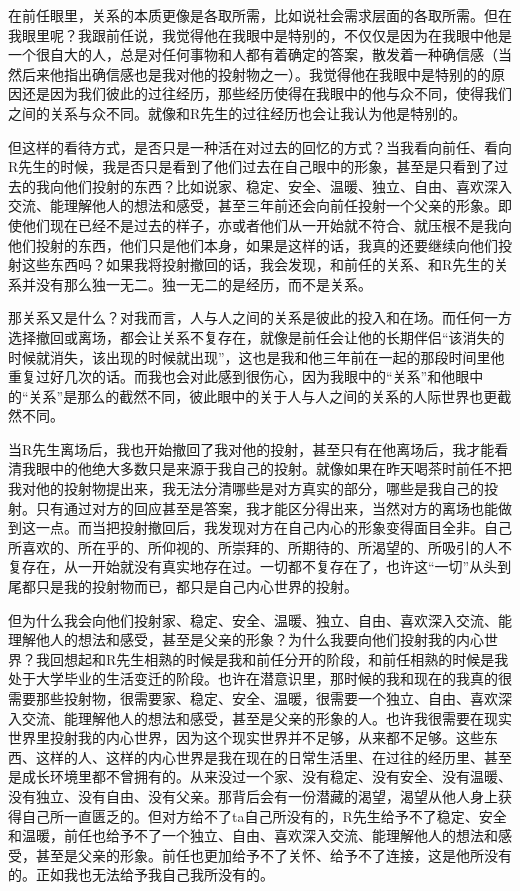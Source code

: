 在前任眼里，关系的本质更像是各取所需，比如说社会需求层面的各取所需。但在我眼里呢？我跟前任说，我觉得他在我眼中是特别的，不仅仅是因为在我眼中他是一个很自大的人，总是对任何事物和人都有着确定的答案，散发着一种确信感（当然后来他指出确信感也是我对他的投射物之一）。我觉得他在我眼中是特别的的原因还是因为我们彼此的过往经历，那些经历使得在我眼中的他与众不同，使得我们之间的关系与众不同。就像和R先生的过往经历也会让我认为他是特别的。

但这样的看待方式，是否只是一种活在对过去的回忆的方式？当我看向前任、看向R先生的时候，我是否只是看到了他们过去在自己眼中的形象，甚至是只看到了过去的我向他们投射的东西？比如说家、稳定、安全、温暖、独立、自由、喜欢深入交流、能理解他人的想法和感受，甚至三年前还会向前任投射一个父亲的形象。即使他们现在已经不是过去的样子，亦或者他们从一开始就不符合、就压根不是我向他们投射的东西，他们只是他们本身，如果是这样的话，我真的还要继续向他们投射这些东西吗？如果我将投射撤回的话，我会发现，和前任的关系、和R先生的关系并没有那么独一无二。独一无二的是经历，而不是关系。

那关系又是什么？对我而言，人与人之间的关系是彼此的投入和在场。而任何一方选择撤回或离场，都会让关系不复存在，就像是前任会让他的长期伴侣“该消失的时候就消失，该出现的时候就出现”，这也是我和他三年前在一起的那段时间里他重复过好几次的话。而我也会对此感到很伤心，因为我眼中的“关系”和他眼中的“关系”是那么的截然不同，彼此眼中的关于人与人之间的关系的人际世界也更截然不同。

当R先生离场后，我也开始撤回了我对他的投射，甚至只有在他离场后，我才能看清我眼中的他绝大多数只是来源于我自己的投射。就像如果在昨天喝茶时前任不把我对他的投射物提出来，我无法分清哪些是对方真实的部分，哪些是我自己的投射。只有通过对方的回应甚至是答案，我才能区分得出来，当然对方的离场也能做到这一点。而当把投射撤回后，我发现对方在自己内心的形象变得面目全非。自己所喜欢的、所在乎的、所仰视的、所崇拜的、所期待的、所渴望的、所吸引的人不复存在，从一开始就没有真实地存在过。一切都不复存在了，也许这“一切”从头到尾都只是我的投射物而已，都只是自己内心世界的投射。

但为什么我会向他们投射家、稳定、安全、温暖、独立、自由、喜欢深入交流、能理解他人的想法和感受，甚至是父亲的形象？为什么我要向他们投射我的内心世界？我回想起和R先生相熟的时候是我和前任分开的阶段，和前任相熟的时候是我处于大学毕业的生活变迁的阶段。也许在潜意识里，那时候的我和现在的我真的很需要那些投射物，很需要家、稳定、安全、温暖，很需要一个独立、自由、喜欢深入交流、能理解他人的想法和感受，甚至是父亲的形象的人。也许我很需要在现实世界里投射我的内心世界，因为这个现实世界并不足够，从来都不足够。这些东西、这样的人、这样的内心世界是我在现在的日常生活里、在过往的经历里、甚至是成长环境里都不曾拥有的。从来没过一个家、没有稳定、没有安全、没有温暖、没有独立、没有自由、没有父亲。那背后会有一份潜藏的渴望，渴望从他人身上获得自己所一直匮乏的。但对方给不了ta自己所没有的，R先生给予不了稳定、安全和温暖，前任也给予不了一个独立、自由、喜欢深入交流、能理解他人的想法和感受，甚至是父亲的形象。前任也更加给予不了关怀、给予不了连接，这是他所没有的。正如我也无法给予我自己我所没有的。

